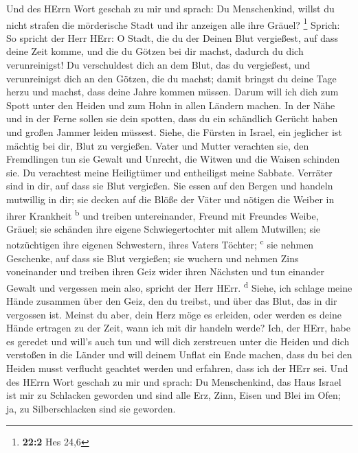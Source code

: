  Und des HErrn Wort geschah zu mir und sprach:
 Du Menschenkind, willst du nicht strafen die mörderische
Stadt und ihr anzeigen alle ihre Gräuel? \footnote{\textbf{22:2} Hes
  24,6}  Sprich: So spricht der Herr HErr: O Stadt, die du
der Deinen Blut vergießest, auf dass deine Zeit komme, und die du Götzen
bei dir machst, dadurch du dich verunreinigst!  Du
verschuldest dich an dem Blut, das du vergießest, und verunreinigst dich
an den Götzen, die du machst; damit bringst du deine Tage herzu und
machst, dass deine Jahre kommen müssen. Darum will ich dich zum Spott
unter den Heiden und zum Hohn in allen Ländern machen.  In
der Nähe und in der Ferne sollen sie dein spotten, dass du ein
schändlich Gerücht haben und großen Jammer leiden müssest.
 Siehe, die Fürsten in Israel, ein jeglicher ist mächtig
bei dir, Blut zu vergießen.  Vater und Mutter verachten
sie, den Fremdlingen tun sie Gewalt und Unrecht, die Witwen und die
Waisen schinden sie.  Du verachtest meine Heiligtümer und
entheiligst meine Sabbate.  Verräter sind in dir, auf dass
sie Blut vergießen. Sie essen auf den Bergen und handeln mutwillig in
dir;  sie decken auf die Blöße der Väter und nötigen die
Weiber in ihrer Krankheit \textsuperscript{b}  und
treiben untereinander, Freund mit Freundes Weibe, Gräuel; sie schänden
ihre eigene Schwiegertochter mit allem Mutwillen; sie notzüchtigen ihre
eigenen Schwestern, ihres Vaters Töchter; \textsuperscript{c}
 sie nehmen Geschenke, auf dass sie Blut vergießen; sie
wuchern und nehmen Zins voneinander und treiben ihren Geiz wider ihren
Nächsten und tun einander Gewalt und vergessen mein also, spricht der
Herr HErr. \textsuperscript{d}  Siehe, ich schlage meine
Hände zusammen über den Geiz, den du treibst, und über das Blut, das in
dir vergossen ist.  Meinst du aber, dein Herz möge es
erleiden, oder werden es deine Hände ertragen zu der Zeit, wann ich mit
dir handeln werde? Ich, der HErr, habe es geredet und will's auch tun
 und will dich zerstreuen unter die Heiden und dich
verstoßen in die Länder und will deinem Unflat ein Ende machen,
 dass du bei den Heiden musst verflucht geachtet werden
und erfahren, dass ich der HErr sei.  Und des HErrn Wort
geschah zu mir und sprach:  Du Menschenkind, das Haus
Israel ist mir zu Schlacken geworden und sind alle Erz, Zinn, Eisen und
Blei im Ofen; ja, zu Silberschlacken sind sie geworden. 
